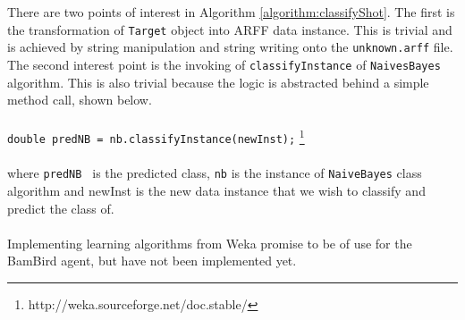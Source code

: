 There are two points of interest in Algorithm \ref{algorithm:classifyShot}. The first is the transformation of \texttt{Target} object into ARFF data instance. This is trivial and is achieved by string manipulation and string writing onto the \texttt{unknown.arff} file. The second interest point is the invoking of \texttt{classifyInstance} of \texttt{NaivesBayes} algorithm. This is also trivial because the logic is abstracted behind a simple method call, shown below.
\ \\
\ \\
\texttt{double predNB = nb.classifyInstance(newInst);} \footnote{http://weka.sourceforge.net/doc.stable/}
\ \\
\ \\
where \texttt{predNB } is the predicted class, \texttt{nb} is the instance of \texttt{NaiveBayes} class algorithm and newInst
is the new data instance that we wish to classify and predict the class of.
\ \\
\ \\
Implementing learning algorithms from Weka promise to be of use for the BamBird agent, but have not been implemented yet.